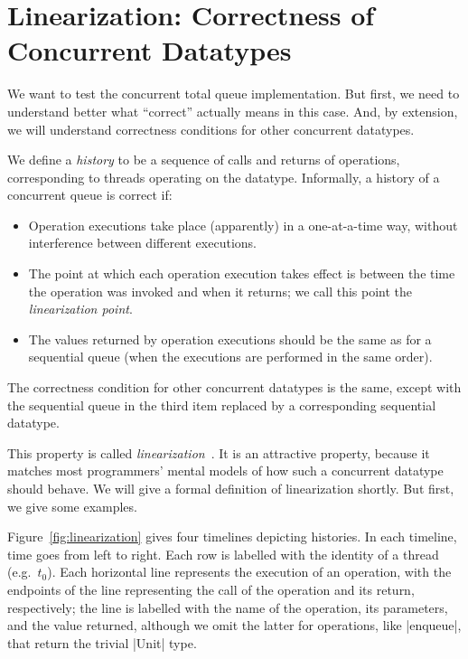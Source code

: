 \section{Linearization: Correctness of Concurrent Datatypes}
\label{sec:linearization}

We want to test the concurrent total queue implementation.  But first, we need
to understand better what ``correct'' actually means in this case.  And, by
extension, we will understand correctness conditions for other concurrent
datatypes. 

We define a \emph{history} to be a sequence of calls and
returns of operations, corresponding to threads operating on the datatype.
Informally, a history of a concurrent queue is correct if:
%
\begin{itemize}
\item Operation executions take place (apparently) in a one-at-a-time
  way, without interference between different executions.

\item The point at which each operation execution takes effect is between the
time the operation was invoked and when it returns; we call this point
the \emph{linearization point}.

\item The values returned by operation executions should be the same as for a
sequential queue (when the executions are performed in the same order).
\end{itemize}
%
The correctness condition for other concurrent datatypes is the same, except
with the sequential queue in the third item replaced by a corresponding
sequential datatype.

This property is called
\emph{linearization}~\cite{herlihy-wing}.  It is an
attractive property, because it matches most programmers' mental models of how
such a concurrent datatype should behave.
%
We will give a formal definition of linearization shortly.  But first, we
give some examples.  

Figure~\ref{fig:linearization} gives four timelines depicting
histories.  In each timeline, time goes from left to right.  Each row is
labelled with the identity of a thread (e.g.~$t_0$).  Each horizontal line
represents the execution of an operation, with the endpoints of the line
representing the call of the operation and its return, respectively; the line
is labelled with the name of the operation, its parameters, and the value
returned, although we omit the latter for operations, like |enqueue|, that
return the trivial |Unit| type.

